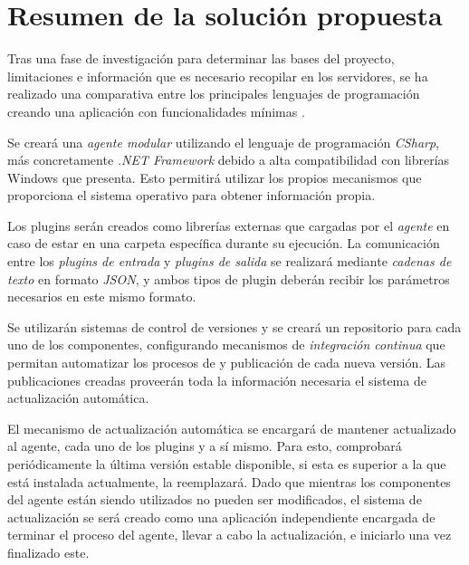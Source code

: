 \section{Resumen de la solución propuesta} \label{sec:sol}

Tras una fase de investigación para determinar las bases del proyecto, limitaciones e información que es necesario recopilar en los servidores, se ha realizado una comparativa entre los principales lenguajes de programación creando una aplicación con funcionalidades mínimas . 

Se creará una \textit{agente modular} utilizando el lenguaje de programación \textit{CSharp}, más concretamente \textit{.NET Framework} debido a alta compatibilidad con librerías Windows que presenta. Esto permitirá utilizar los propios mecanismos que proporciona el sistema operativo para obtener información propia.

Los plugins serán creados como librerías externas que  cargadas por el \textit{agente} en caso de estar en una carpeta específica durante su ejecución. La comunicación entre los \textit{plugins de entrada} y \textit{plugins de salida} se realizará mediante \textit{cadenas de texto} en formato \textit{JSON}, y ambos tipos de plugin deberán recibir los parámetros necesarios en este mismo formato.

Se utilizarán sistemas de control de versiones y se creará un repositorio para cada uno de los componentes, configurando mecanismos de \textit{integración continua} que permitan automatizar los procesos de  y publicación de cada nueva versión. Las publicaciones creadas proveerán toda la información necesaria  el sistema de actualización automática.

El mecanismo de actualización automática se encargará de mantener actualizado al agente, cada uno de los plugins y a sí mismo. Para esto, comprobará periódicamente la última versión estable disponible, si esta es superior a la que está instalada actualmente, la reemplazará. Dado que mientras los componentes del agente están siendo utilizados no pueden ser modificados, el sistema de actualización se será creado como una aplicación independiente encargada de terminar el proceso del agente, llevar a cabo la actualización, e iniciarlo una vez finalizado este.

